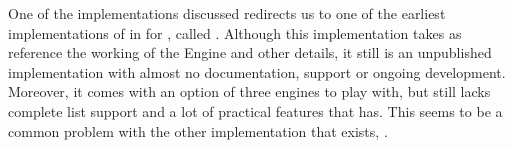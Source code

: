 \documentclass[thesis-solanki.tex]{subfiles}
\begin{document}
One of the implementations discussed redirects us to one of the earliest implementations of  in
 for , called  
\cite{website:mini-prolog-hugs98}.
Although this implementation takes as reference the working of the  Engine
and other details, it still is an unpublished implementation with almost no documentation, support  or ongoing
development.
Moreover, it comes with an option of three engines to play
with, but still lacks complete list support
and a lot of practical features that  has.
This seems to be a common problem with the other implementation that exists, \cite{website:takashi-workplace}.
\end{document}

